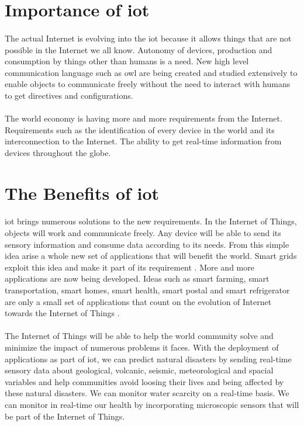 \documentclass[oneside,12pt,a4paper,final]{book}
\begin{document}
\section{Importance of \gls{iot}}
\paragraph{}
The actual Internet is evolving into the \gls{iot} because it allows things that are not possible in the Internet we all know. Autonomy of devices, production and consumption by things other than humans is a need. New high level communication language such as \gls{owl} are being created and studied extensively to enable objects to communicate freely without the need to interact with humans to get directives and configurations.
\paragraph{}
The world economy is having more and more requirements from the Internet. Requirements such as the identification of every device in the world and its interconnection to the Internet. The ability to get real-time information from devices throughout the globe.
\paragraph{}

\section{The Benefits of \gls{iot}}
\paragraph{}
\gls{iot} brings numerous solutions to the new requirements. In the Internet of Things, objects will work and communicate freely. Any device will be able to send its sensory information and consume data according to its needs. From this simple idea arise a whole new set of applications that will benefit the world. Smart grids exploit this idea and make it part of its requirement \cite{ref8}. More and more applications are now being developed. Ideas such as smart farming, smart transportation, smart homes, smart health, smart postal and smart refrigerator are only a small set of applications that count on the evolution of Internet towards the Internet of Things \cite{ref19}.
\paragraph{}
The Internet of Things will be able to help the world community solve and minimize the impact of numerous problems it faces. With the deployment of applications as part of \gls{iot}, we can predict natural disasters by sending real-time sensory data about geological, volcanic, seismic, meteorological and spacial variables and help communities avoid loosing their lives and being affected by these natural disasters. We can monitor water scarcity on a real-time basis. We can monitor in real-time our health by incorporating microscopic sensors that will be part of the Internet of Things.
\end{document}
